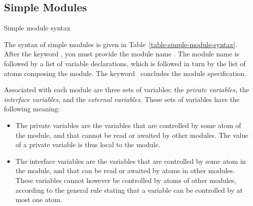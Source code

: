 {\subsection{Simple Modules}

\begin{table}
\caption{Simple module syntax}
\label{table-simple-module-syntax}
\end{table}

The syntax of simple modules is given in
Table~\ref{table-simple-module-syntax}.  After the keyword \MODULE, you must
provide the module name \modulename.  The module name is followed by a
list of variable declarations, which is followed in turn by the
list of atoms composing the module.  The keyword \ENDMODULE\ concludes
the module specification.

Associated with each module are three sets of variables: the {\em
private variables,} the {\em interface variables,} and the {\em
external variables.}  These sets of variables have the following
meaning: 
%
\begin{itemize}

\item The private variables are the
variables that are controlled by some atom of the module, and that
cannot be read or awaited by other modules.  The value of a private
variable is thus local to the module.

\item The interface variables  are the
variables that are controlled by some atom in the module, and that can
be read or awaited by atoms in other modules.  These variables cannot
however be controlled by atoms of other modules, according to the
general rule stating that a variable can be controlled by at most one
atom. 


\end{itemize}}
